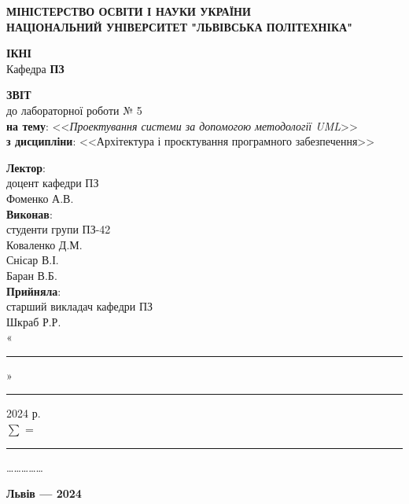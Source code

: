 \documentclass[oneside,14pt]{extarticle}
\newcommand\subject{Архітектура і проєктування програмного забезпечення}
\newcommand\lecturer{доцент кафедри ПЗ\\Фоменко А.В.}
\newcommand\teacher{старший викладач кафедри ПЗ\\Шкраб Р.Р.}
\newcommand\mygroup{ПЗ-42}
\newcommand\lab{5}
\newcommand\theme{Проектування системи за допомогою методології UML}
\begin{document}
\begin{normalsize}
	\begin{titlepage}
		\thispagestyle{empty}
		\begin{center}
			\textbf{МІНІСТЕРСТВО ОСВІТИ І НАУКИ УКРАЇНИ\\
				НАЦІОНАЛЬНИЙ УНІВЕРСИТЕТ "ЛЬВІВСЬКА ПОЛІТЕХНІКА"}
		\end{center}
		\begin{flushright}
			\textbf{ІКНІ}\\
			Кафедра \textbf{ПЗ}
		\end{flushright}
		\vspace{80pt}
		\begin{center}
			\textbf{ЗВІТ}\\
			\vspace{10pt}
			до лабораторної роботи № \lab\\
			\textbf{на тему}: <<\textit{\theme}>>\\
			\textbf{з дисципліни}: <<\subject>>
		\end{center}
		\vspace{80pt}
		\begin{flushright}
			
			\textbf{Лектор}:\\
			\lecturer\\
			\vspace{28pt}
			\textbf{Виконав}:\\
			
			студенти групи \mygroup\\
			Коваленко Д.М.\\
			Снісар В.І.\\
			Баран В.Б.\\
			\vspace{28pt}
			\textbf{Прийняла}:\\
			
			\teacher\\
			
			\vspace{28pt}
			«\rule{1cm}{0.15mm}» \rule{1.5cm}{0.15mm} 2024 р.\\
			$\sum$ = \rule{1cm}{0.15mm}……………\\
			
		\end{flushright}
		\vspace{\fill}
		\begin{center}
			\textbf{Львів — 2024}
		\end{center}
	\end{titlepage}
		

\end{normalsize}
\end{document}
